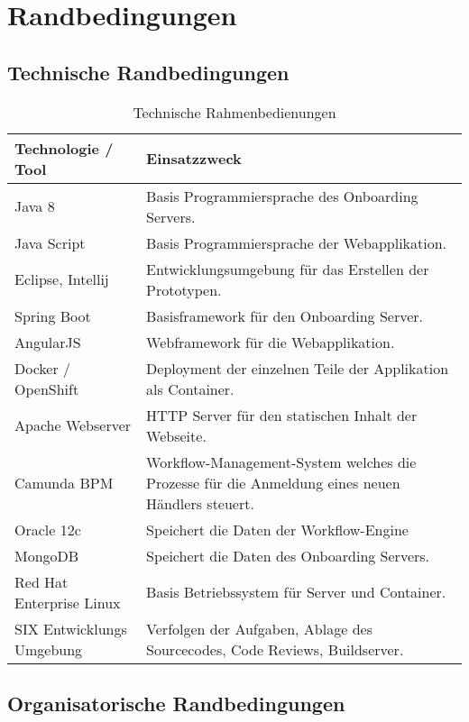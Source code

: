 \chapter{Randbedingungen}

\section{Technische Randbedingungen}

\begin{table}[H]
	\centering
	\caption{Technische Rahmenbedienungen}
	\begin{tabular}{ | p{4cm} | p{11cm} | }
		\toprule
		{\textbf{Technologie / Tool}} & {\textbf{Einsatzzweck}} \\
		\midrule
		Java 8 & Basis Programmiersprache des Onboarding Servers. \\ \hline
		Java Script & Basis Programmiersprache der Webapplikation.\\ \hline
		Eclipse, Intellij & Entwicklungsumgebung für das Erstellen der Prototypen. \\ \hline
		Spring Boot & Basisframework für den Onboarding Server.  \\ \hline
		AngularJS & Webframework für die Webapplikation. \\ \hline
		Docker / OpenShift & Deployment der einzelnen Teile der Applikation als Container. \\ \hline
		Apache Webserver & HTTP Server für den statischen Inhalt der Webseite. \\ \hline
		Camunda BPM & Workflow-Management-System welches die Prozesse für die Anmeldung eines neuen Händlers steuert. \\ \hline
		Oracle 12c & Speichert die Daten der Workflow-Engine \\ \hline
		MongoDB & Speichert die Daten des Onboarding Servers. \\ \hline
		Red Hat Enterprise Linux & Basis Betriebssystem für Server und Container. \\ \hline
		SIX Entwicklungs Umgebung  & Verfolgen der Aufgaben, Ablage des Sourcecodes, Code Reviews, Buildserver.\\
		\bottomrule
	\end{tabular}
\end{table}

\section{Organisatorische Randbedingungen}

